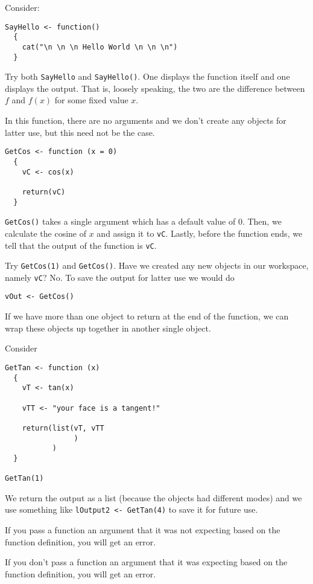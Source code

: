 Consider:
\begin{verbatim}
SayHello <- function()
  {
    cat("\n \n \n Hello World \n \n \n")
  }
\end{verbatim}
Try both \texttt{SayHello} and \texttt{SayHello()}. One displays the
function itself and one displays the output. That is, loosely
speaking, the two are the difference between $f$ and $f(x)$ for some
fixed value $x$.

In this function, there are no arguments and we don't create any
objects for latter use, but this need not be the case.

\begin{verbatim}
GetCos <- function (x = 0)
  {
    vC <- cos(x)

    return(vC)
  }
\end{verbatim}

\texttt{GetCos()} takes a single argument which has a default value of
0. Then, we calculate the cosine of $x$ and assign it to
\texttt{vC}. Lastly, before the function ends, we tell \R{} that the
output of the function is \texttt{vC}.

Try \texttt{GetCos(1)} and \texttt{GetCos()}. Have we created any new
objects in our workspace, namely \texttt{vC}? No. To save the output
for latter use we would do
\begin{verbatim}
vOut <- GetCos()
\end{verbatim}

If we have more than one object to return at the end of the function,
we can wrap these objects up together in another single object.

Consider 
\begin{verbatim}
GetTan <- function (x)
  {
    vT <- tan(x)

    vTT <- "your face is a tangent!"
    
    return(list(vT, vTT
                )
           )
  }

GetTan(1)
\end{verbatim}

We return the output as a list (because the objects had different
modes) and we use something like \verb=lOutput2 <- GetTan(4)= to save
it for future use.

If you pass a function an argument that it was not expecting based on the
function definition, you will get an error.

If you don't pass a function an argument that it was expecting based
on the function definition, you will get an error.

